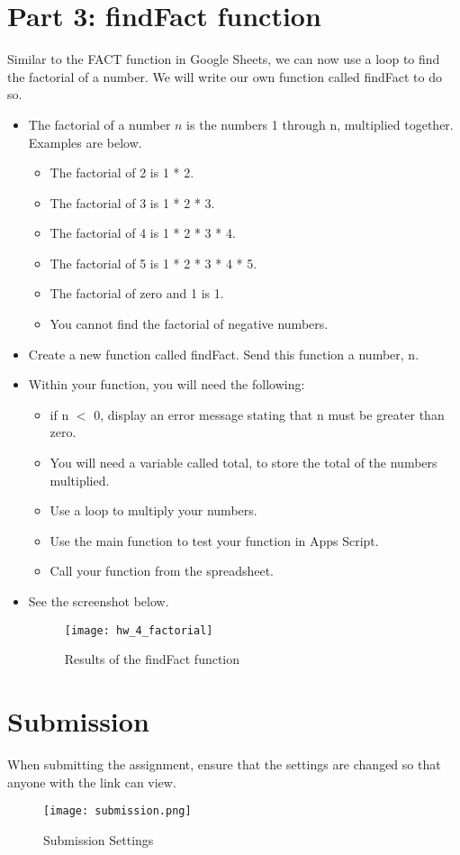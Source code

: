 \documentclass{article}
\begin{document}
\section*{Part 3: findFact function}
Similar to the FACT function in Google Sheets, we can now use a loop to find the factorial of a number.  We will write our own function called findFact to do so.
\begin{itemize}
	\item The factorial of a number $n$ is the numbers 1 through n, multiplied together.  Examples are below.
	\begin{itemize}
		\item The factorial of 2 is 1 * 2.
		\item The factorial of 3 is 1 * 2 * 3.
		\item The factorial of 4 is 1 * 2 * 3 * 4.
		\item The factorial of 5 is 1 * 2 * 3 * 4 * 5.  
		\item The factorial of zero and 1 is 1.  
		\item You cannot find the factorial of negative numbers.
	\end{itemize}
	\item Create a new function called findFact.  Send this function a number, n.
	\item Within your function, you will need the following:
	\begin{itemize}
		\item if n $<$ 0, display an error message stating that n must be greater than zero.
		\item You will need a variable called total, to store the total of the numbers multiplied.
		\item Use a loop to multiply your numbers.
		\item Use the main function to test your function in Apps Script.
		\item Call your function from the spreadsheet.
	\end{itemize}
	\item See the screenshot below.
	\begin{figure}[H]
  		\centering
  		\texttt{[image: hw\_4\_factorial]}
  		\caption{Results of the findFact function}
	\end{figure}
\end{itemize}

\section*{Submission}
When submitting the assignment, ensure that the settings are changed so that anyone with the link can view.
\begin{figure}[H]
  \centering
  \texttt{[image: submission.png]}
  \caption{Submission Settings}
\end{figure}
\end{document}

